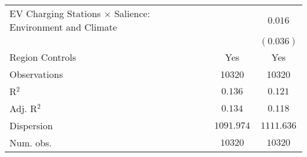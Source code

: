 \begin{center}
\begin{tiny}
\begin{longtable}{l@{} c@{} c@{}}
\quad EV Charging Stations $\times$ Salience: Environment and Climate    &                  & $0.016$          \\
                                                                         &                  & $(0.036)$        \\
\hline
Region Controls                                                          & Yes              & Yes              \\
Observations                                                             & 10320            & 10320            \\
R$^2$                                                                    & $0.136$          & $0.121$          \\
Adj. R$^2$                                                               & $0.134$          & $0.118$          \\
Dispersion                                                               & $1091.974$       & $1111.636$       \\
Num. obs.                                                                & $10320$          & $10320$          \\
\end{longtable}
\end{tiny}
\end{center}
